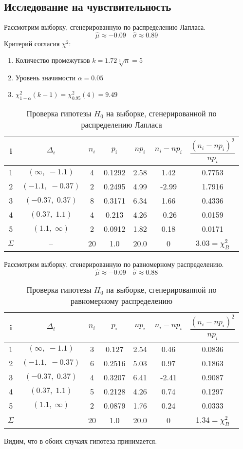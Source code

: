 \documentclass[a4paper,12pt]{article} %
\begin{document}
\subsection{Исследование на чувствительность}
Рассмотрим выборку, сгенерированную по распределению Лапласа.
$$\hat{\mu}\approx-0.09\quad\hat{\sigma}\approx0.89$$
Критерий согласия $\chi^2$:
\begin{enumerate}
    \item Количество промежутков $k=1.72\sqrt[3]{n}=5$
    \item Уровень значимости $\alpha=0.05$
    \item $\chi^2_{1-\alpha}(k-1)=\chi^2_{0.95}(4)=9.49$
\end{enumerate}
\begin{table}[H]
    \centering
    \begin{tabular}{|c|c|c|c|c|c|c|}
    \hline
    i&$\Delta_i$&$n_i$&$p_i$&$np_i$&$n_i-np_i$&$\dfrac{(n_i-np_i)^2}{np_i}$\\
    \hline
    1&$(\infty,\;-1.1)$&4&0.1292&2.58&1.42&0.7753\\
    \hline
    2&$(-1.1,\;-0.37)$&2&0.2495&4.99&-2.99&1.7916\\
    \hline
    3&$(-0.37,\;0.37)$&8&0.3171&6.34&1.66&0.4336\\
    \hline
    4&$(0.37,\;1.1)$&4&0.213&4.26&-0.26&0.0159\\
    \hline
    5&$(1.1,\;\infty)$&2&0.0912&1.82&0.18&0.0171\\
    \hline
    $\Sigma$&--&20&1.0&20.0&0&3.03$=\chi^2_B$\\
    \hline
    \end{tabular}
    \caption{Проверка гипотезы $H_0$ на выборке, сгенерированной по распределению Лапласа}
    \label{tab:tab2}
\end{table}
Рассмотрим выборку, сгенерированную по равномерному распределению.
$$\hat{\mu}\approx-0.09\quad\hat{\sigma}\approx0.88$$
\begin{table}[H]
    \centering
    \begin{tabular}{|c|c|c|c|c|c|c|}
    \hline
    i&$\Delta_i$&$n_i$&$p_i$&$np_i$&$n_i-np_i$&$\dfrac{(n_i-np_i)^2}{np_i}$\\
    \hline
    1&$(\infty,\;-1.1)$&3&0.127&2.54&0.46&0.0836\\
    \hline
    2&$(-1.1,\;-0.37)$&6&0.2516&5.03&0.97&0.1863\\
    \hline
    3&$(-0.37,\;0.37)$&4&0.3207&6.41&-2.41&0.9087\\
    \hline
    4&$(0.37,\;1.1)$&5&0.2128&4.26&0.74&0.1297\\
    \hline
    5&$(1.1,\;\infty)$&2&0.0879&1.76&0.24&0.0333\\
    \hline
    $\Sigma$&--&20&1.0&20.0&0&1.34$=\chi^2_B$\\
    \hline
    \end{tabular}
    \caption{Проверка гипотезы $H_0$ на выборке, сгенерированной по равномерному распределению}
    \label{tab:tab3}
\end{table}
Видим, что в обоих случаях гипотеза принимается.
\end{document}
